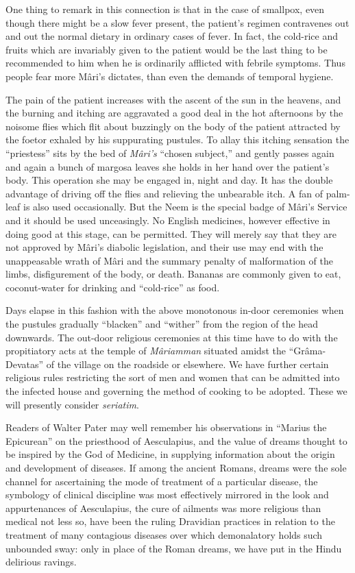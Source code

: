 \documentclass[a4paper, 12pt, oneside, english]{article}
\begin{document}
One thing to remark in this connection is that in the case of smallpox, even though there might be a slow fever present, the patient's regimen contravenes out and out the normal dietary in ordinary cases of fever. In fact, the cold-rice and fruits which are invariably given to the patient would be the last thing to be recommended to him when he is ordinarily afflicted with febrile symptoms. Thus people fear more Mâri's dictates, than even the demands of temporal hygiene.

The pain of the patient increases with the ascent of the sun in the heavens, and the burning and itching are aggravated a good deal in the hot afternoons by the noisome flies which flit about buzzingly on the body of the patient attracted by the foetor exhaled by his suppurating pustules. To allay this itching sensation the ``priestess'' sits by the bed of \emph{Mâri's} ``chosen subject,'' and gently passes again and again a bunch of margosa leaves she holds in her hand over the patient's body. This operation she may be engaged in, night and day. It has the double advantage of driving off the flies and relieving the unbearable itch. A fan of palm-leaf is also used occasionally. But the Neem is the special badge of Mâri's Service and it should be used unceasingly. No English medicines, however effective in doing good at this stage, can be permitted. They will merely say that they are not approved by Mâri's diabolic legislation, and their use may end with the unappeasable wrath of Mâri and the summary penalty of malformation of the limbs, disfigurement of the body, or death. Bananas are commonly given to eat, coconut-water for drinking and ``cold-rice'' as food.

Days elapse in this fashion with the above monotonous in-door ceremonies when the pustules gradually ``blacken'' and ``wither'' from the region of the head downwards. The out-door religious ceremonies at this time have to do with the propitiatory acts at the temple of \emph{Mâriamman} situated amidst the ``Grâma-Devatas'' of the village on the roadside or elsewhere. We have further certain religious rules restricting the sort of men and women that can be admitted into the infected house and governing the method of cooking to be adopted. These we will presently consider \emph{seriatim}.

Readers of Walter Pater may well remember his observations in ``Marius the Epicurean'' on the priesthood of Aesculapius, and the value of dreams thought to be inspired by the God of Medicine, in supplying information about the origin and development of diseases. If among the ancient Romans, dreams were the sole channel for ascertaining the mode of treatment of a particular disease, the symbology of clinical discipline was most effectively mirrored in the look and appurtenances of Aesculapius, the cure of ailments was more religious than medical not less so, have been the ruling Dravidian practices in relation to the treatment of many contagious diseases over which demonalatory holds such unbounded sway: only in place of the Roman dreams, we have put in the Hindu delirious ravings.
\end{document}
